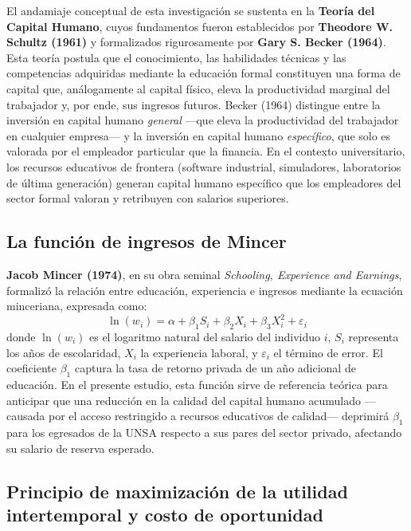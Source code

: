 \documentclass[11pt, a4paper]{article}
\begin{document}
El andamiaje conceptual de esta investigación se sustenta en la \textbf{Teoría del Capital Humano}, cuyos fundamentos fueron establecidos por \textbf{Theodore W. Schultz (1961)} y formalizados rigurosamente por \textbf{Gary S. Becker (1964)}. Esta teoría postula que el conocimiento, las habilidades técnicas y las competencias adquiridas mediante la educación formal constituyen una forma de capital que, análogamente al capital físico, eleva la productividad marginal del trabajador y, por ende, sus ingresos futuros. Becker (1964) distingue entre la inversión en capital humano \textit{general} —que eleva la productividad del trabajador en cualquier empresa— y la inversión en capital humano \textit{específico}, que solo es valorada por el empleador particular que la financia. En el contexto universitario, los recursos educativos de frontera (software industrial, simuladores, laboratorios de última generación) generan capital humano específico que los empleadores del sector formal valoran y retribuyen con salarios superiores.

\subsection{La función de ingresos de Mincer}

\textbf{Jacob Mincer (1974)}, en su obra seminal \textit{Schooling, Experience and Earnings}, formalizó la relación entre educación, experiencia e ingresos mediante la ecuación minceriana, expresada como:
\[
\ln(w_i) = \alpha + \beta_1 S_i + \beta_2 X_i + \beta_3 X_i^2 + \varepsilon_i
\]
donde $\ln(w_i)$ es el logaritmo natural del salario del individuo $i$, $S_i$ representa los años de escolaridad, $X_i$ la experiencia laboral, y $\varepsilon_i$ el término de error. El coeficiente $\beta_1$ captura la tasa de retorno privada de un año adicional de educación. En el presente estudio, esta función sirve de referencia teórica para anticipar que una reducción en la calidad del capital humano acumulado —causada por el acceso restringido a recursos educativos de calidad— deprimirá $\beta_1$ para los egresados de la UNSA respecto a sus pares del sector privado, afectando su salario de reserva esperado.

\subsection{Principio de maximización de la utilidad intertemporal y costo de oportunidad}
\end{document}
